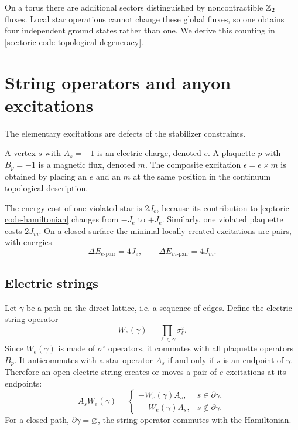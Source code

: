 On a torus there are additional sectors distinguished by noncontractible
\(\mathbb{Z}_2\) fluxes.  Local star operations cannot change these global fluxes, so
one obtains four independent ground states rather than one.  We derive this
counting in \cref{sec:toric-code-topological-degeneracy}.

\section{String operators and anyon excitations}
\label{sec:toric-code-anyons}

The elementary excitations are defects of the stabilizer constraints.

\begin{definition}
A vertex \(s\) with \(A_s=-1\) is an electric charge, denoted \(e\).  A plaquette
\(p\) with \(B_p=-1\) is a magnetic flux, denoted \(m\).  The composite excitation
\(\epsilon=e\times m\) is obtained by placing an \(e\) and an \(m\) at the same
position in the continuum topological description.
\end{definition}

The energy cost of one violated star is \(2J_e\), because its contribution to
\cref{eq:toric-code-hamiltonian} changes from \(-J_e\) to \(+J_e\).  Similarly,
one violated plaquette costs \(2J_m\).  On a closed surface the minimal locally
created excitations are pairs, with energies
\begin{equation}
\label{eq:toric-code-pair-energy-costs}
    \Delta E_{e\text{-pair}}=4J_e,
    \qquad
    \Delta E_{m\text{-pair}}=4J_m .
\end{equation}

\subsection{Electric strings}

Let \(\gamma\) be a path on the direct lattice, i.e. a sequence of edges.  Define the electric string operator
\begin{equation}
\label{eq:toric-code-electric-string}
    W_e(\gamma)
    =
    \prod_{\ell\in\gamma}\sigma^z_{\ell} .
\end{equation}
Since \(W_e(\gamma)\) is made of \(\sigma^z\) operators, it commutes with all
plaquette operators \(B_p\).  It anticommutes with a star operator \(A_s\) if and
only if \(s\) is an endpoint of \(\gamma\).  Therefore an open electric string
creates or moves a pair of \(e\) excitations at its endpoints:
\begin{equation}
\label{eq:e-string-endpoint-action}
    A_s W_e(\gamma)
    =
    \begin{cases}
        -W_e(\gamma)A_s, & s\in\partial\gamma,\\
        \phantom{-}W_e(\gamma)A_s, & s\notin\partial\gamma .
    \end{cases}
\end{equation}
For a closed path, \(\partial\gamma=\varnothing\), the string operator commutes
with the Hamiltonian.

